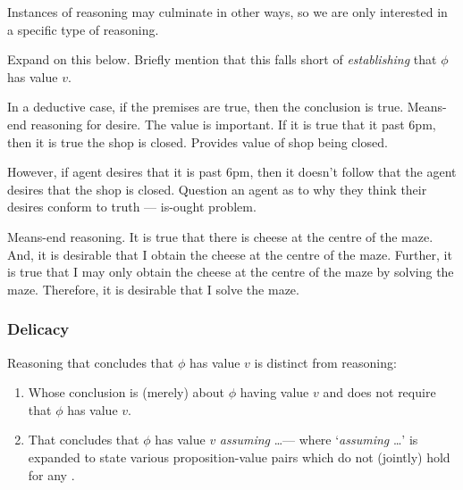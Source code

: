 \begin{note}
  Instances of reasoning may culminate in other ways, so we are only interested in a specific type of reasoning.
\end{note}

\begin{note}
  Expand on this below.
  Briefly mention that this falls short of \emph{establishing} that \(\phi\) has value \(v\).
\end{note}

\begin{note}
  In a deductive case, if the premises are true, then the conclusion is true.
  Means-end reasoning for desire.
  The value is important.
  If it is true that it past 6pm, then it is true the shop is closed.
  Provides value of shop being closed.

  However, if agent desires that it is past 6pm, then it doesn't follow that the agent desires that the shop is closed.
  Question an agent as to why they think their desires conform to truth --- is-ought problem.

  Means-end reasoning.
  It is true that there is cheese at the centre of the maze.
  And, it is desirable that I obtain the cheese at the centre of the maze.
  Further, it is true that I may only obtain the cheese at the centre of the maze by solving the maze.
  Therefore, it is desirable that I solve the maze.
\end{note}

\subsubsection{Delicacy}

\begin{note}
  Reasoning that concludes that \(\phi\) has value \(v\) is distinct from reasoning:
  \begin{enumerate}
  \item
    \label{CS:delicacy:O}
    Whose conclusion is (merely) about \(\phi\) having value \(v\) and does not require that \(\phi\) has value \(v\).
  \item
    \label{CS:delicacy:A}
    That concludes that \(\phi\) has value \(v\) \emph{assuming} \dots\space --- where `\emph{assuming} \dots\space' is expanded to state various proposition-value pairs which do not (jointly) hold for any \epVW{}.
  \end{enumerate}
\end{note}

